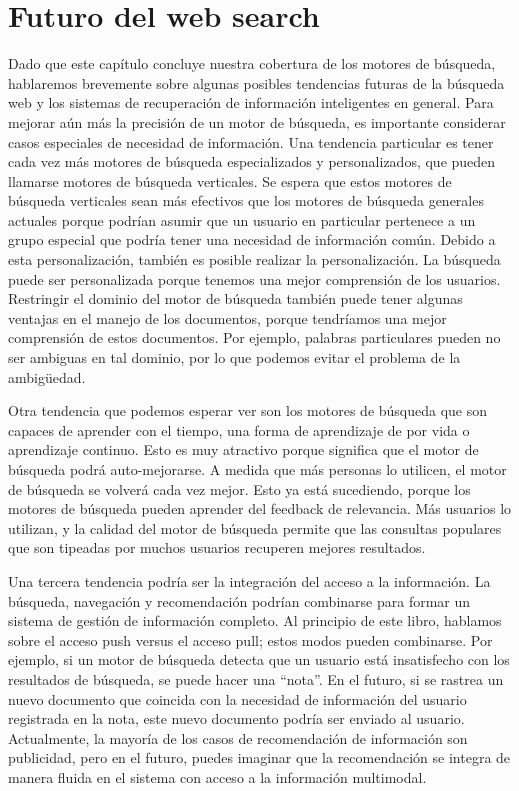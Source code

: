 \section{Futuro del web search}

Dado que este capítulo concluye nuestra cobertura de los motores de búsqueda, hablaremos brevemente sobre algunas posibles tendencias futuras de la búsqueda web y los sistemas de recuperación de información inteligentes en general. Para mejorar aún más la precisión de un motor de búsqueda, es importante considerar casos especiales de necesidad de información. Una tendencia particular es tener cada vez más motores de búsqueda especializados y personalizados, que pueden llamarse motores de búsqueda verticales. Se espera que estos motores de búsqueda verticales sean más efectivos que los motores de búsqueda generales actuales porque podrían asumir que un usuario en particular pertenece a un grupo especial que podría tener una necesidad de información común. Debido a esta personalización, también es posible realizar la personalización. La búsqueda puede ser personalizada porque tenemos una mejor comprensión de los usuarios. Restringir el dominio del motor de búsqueda también puede tener algunas ventajas en el manejo de los documentos, porque tendríamos una mejor comprensión de estos documentos. Por ejemplo, palabras particulares pueden no ser ambiguas en tal dominio, por lo que podemos evitar el problema de la ambigüedad.

Otra tendencia que podemos esperar ver son los motores de búsqueda que son capaces de aprender con el tiempo, una forma de aprendizaje de por vida o aprendizaje continuo. Esto es muy atractivo porque significa que el motor de búsqueda podrá auto-mejorarse. A medida que más personas lo utilicen, el motor de búsqueda se volverá cada vez mejor. Esto ya está sucediendo, porque los motores de búsqueda pueden aprender del feedback de relevancia. Más usuarios lo utilizan, y la calidad del motor de búsqueda permite que las consultas populares que son tipeadas por muchos usuarios recuperen mejores resultados.

Una tercera tendencia podría ser la integración del acceso a la información. La búsqueda, navegación y recomendación podrían combinarse para formar un sistema de gestión de información completo. Al principio de este libro, hablamos sobre el acceso push versus el acceso pull; estos modos pueden combinarse. Por ejemplo, si un motor de búsqueda detecta que un usuario está insatisfecho con los resultados de búsqueda, se puede hacer una “nota”. En el futuro, si se rastrea un nuevo documento que coincida con la necesidad de información del usuario registrada en la nota, este nuevo documento podría ser enviado al usuario. Actualmente, la mayoría de los casos de recomendación de información son publicidad, pero en el futuro, puedes imaginar que la recomendación se integra de manera fluida en el sistema con acceso a la información multimodal.

